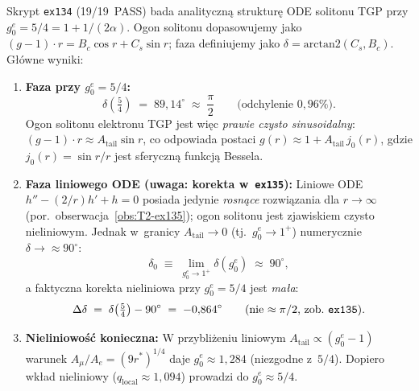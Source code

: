 \begin{observation}[Faza ogona solitonu TGP przy $g_0^e = 5/4$
  (\texttt{ex134})]\label{obs:T2-phase-pi2}
  Skrypt \texttt{ex134} (19/19~PASS) bada analityczn\k{a} struktur\k{e} ODE
  solitonu TGP przy $g_0^e = 5/4 = 1 + 1/(2\alpha)$.
  Ogon solitonu dopasowujemy jako
  $(g-1)\cdot r = B_c\cos r + C_s\sin r$; faza definiujemy jako
  $\delta = \mathrm{arctan2}(C_s, B_c)$.
  G\l{}\'owne wyniki:
  \begin{enumerate}
    \item \textbf{Faza przy $g_0^e = 5/4$:}
      \begin{equation}\label{eq:T2-phase-5-4}
        \delta\!\left(\tfrac{5}{4}\right) \;=\; 89{,}14^\circ
        \;\approx\; \frac{\pi}{2}
        \qquad \text{(odchylenie $0{,}96\%$).}
      \end{equation}
      Ogon solitonu elektronu TGP jest wi\k{e}c \emph{prawie czysto
      sinusoidalny}: $(g-1)\cdot r \approx A_{\mathrm{tail}}\sin r$,
      co odpowiada postaci $g(r) \approx 1 + A_{\mathrm{tail}}\,j_0(r)$,
      gdzie $j_0(r) = \sin r/r$ jest sfery\-czn\k{a} funkcj\k{a} Bessela.

    \item \textbf{Faza liniowego ODE (uwaga: korekta w~\texttt{ex135}):}
      Liniowe ODE $h'' - (2/r)h' + h = 0$ posiada jedynie
      \emph{rosn\k{a}ce} rozwi\k{a}zania dla $r\to\infty$
      (por.\ obserwacja~\ref{obs:T2-ex135}); ogon solitonu jest
      zjawiskiem czysto nieliniowym.
      Jednak w~granicy $A_{\mathrm{tail}}\to0$ (tj.\ $g_0^e\to1^+$)
      numerycznie $\delta \to \approx 90^\circ$:
      \begin{equation}\label{eq:T2-delta0}
        \delta_0 \;\equiv\; \lim_{g_0^e\to1^+}\delta(g_0^e)
        \;\approx\; 90^\circ,
      \end{equation}
      a faktyczna korekta nieliniowa przy $g_0^e = 5/4$ jest
      \emph{ma\l{}a}:
      \begin{equation}\label{eq:T2-delta-phase}
        \Delta\delta \;=\;
        \delta\!\left(\tfrac{5}{4}\right) - 90^\circ
        \;=\; -0{,}864^\circ
        \qquad\text{(nie $\approx\pi/2$, zob.\ \texttt{ex135}).}
      \end{equation}

    \item \textbf{Nieliniowo\'s\'c konieczna:}
      W przybli\.zeniu liniowym $A_{\mathrm{tail}} \propto (g_0^e - 1)$
      warunek $A_\mu/A_e = (9r^*)^{1/4}$ daje $g_0^e \approx 1{,}284$
      (niezgodne z~$5/4$).
      Dopiero wk\l{}ad nieliniowy ($q_{\mathrm{local}} \approx 1{,}094$)
      prowadzi do $g_0^e \approx 5/4$.


\end{enumerate}
\end{observation}
